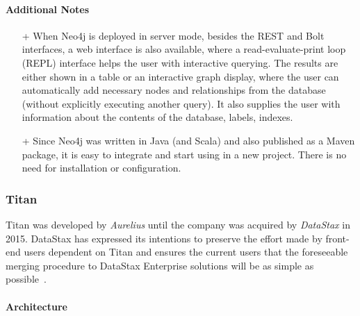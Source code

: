 
\paragraph{Additional Notes}
\begin{itemize}[topsep=0pt]
  \item[+] When Neo4j is deployed in server mode, besides the REST and Bolt interfaces, a web interface is also available, where a read-evaluate-print loop (REPL) interface helps the user with interactive querying. The results are either shown in a table or an interactive graph display, where the user can automatically add necessary nodes and relationships from the database (without explicitly executing another query). It also supplies the user with information about the contents of the database, labels, indexes.
  \item[+] Since Neo4j was written in Java (and Scala) and also published as a Maven package, it is easy to integrate and start using in a new project. There is no need for installation or configuration.
\end{itemize}

\subsubsection{Titan}
\label{sect:titan}

Titan was developed by \emph{Aurelius} until the company was acquired by \emph{DataStax} in 2015. DataStax has expressed its intentions to preserve the effort made by front-end users dependent on Titan and ensures the current users that the foreseeable merging procedure to DataStax Enterprise solutions will be as simple as possible~\cite{titan-datastax-acquirement}.

\paragraph{Architecture}

